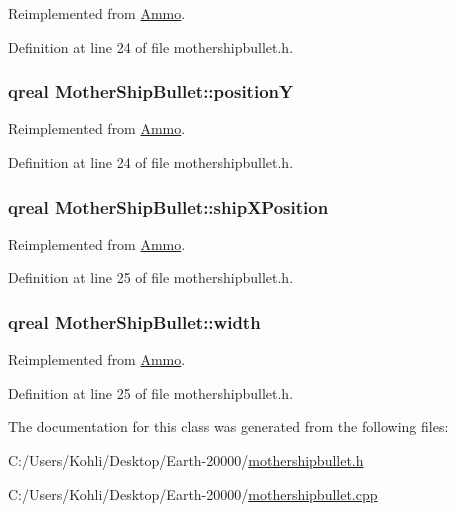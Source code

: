 Reimplemented from \hyperlink{class_ammo_a7df8c23c0a3023e013c25e2b3fff5385}{Ammo}.

Definition at line 24 of file mothershipbullet.h.\hypertarget{class_mother_ship_bullet_ac20e2e77d3cbac30f2189495fbdce88d}{
\subsubsection[{positionY}]{\setlength{\rightskip}{0pt plus 5cm}qreal {\bf MotherShipBullet::positionY}}}
\label{class_mother_ship_bullet_ac20e2e77d3cbac30f2189495fbdce88d}


Reimplemented from \hyperlink{class_ammo_a71fc5db64ac2f32ca10e22f7a7ff0c88}{Ammo}.

Definition at line 24 of file mothershipbullet.h.\hypertarget{class_mother_ship_bullet_af8b80672b755f96fa75b0eb4786fc1a0}{
\subsubsection[{shipXPosition}]{\setlength{\rightskip}{0pt plus 5cm}qreal {\bf MotherShipBullet::shipXPosition}}}
\label{class_mother_ship_bullet_af8b80672b755f96fa75b0eb4786fc1a0}


Reimplemented from \hyperlink{class_ammo_a86583f8632ca9604ef0ae839d78fe5ef}{Ammo}.

Definition at line 25 of file mothershipbullet.h.\hypertarget{class_mother_ship_bullet_ab81cbaea7101d4c9f8ac0c0fbba5fe8a}{
\subsubsection[{width}]{\setlength{\rightskip}{0pt plus 5cm}qreal {\bf MotherShipBullet::width}}}
\label{class_mother_ship_bullet_ab81cbaea7101d4c9f8ac0c0fbba5fe8a}


Reimplemented from \hyperlink{class_ammo_aad7996f9abdcb6ade7e67f7c7f5e5ebe}{Ammo}.

Definition at line 25 of file mothershipbullet.h.

The documentation for this class was generated from the following files:\begin{DoxyCompactItemize}
\item 
C:/Users/Kohli/Desktop/Earth-\/20000/\hyperlink{mothershipbullet_8h}{mothershipbullet.h}\item 
C:/Users/Kohli/Desktop/Earth-\/20000/\hyperlink{mothershipbullet_8cpp}{mothershipbullet.cpp}\end{DoxyCompactItemize}
